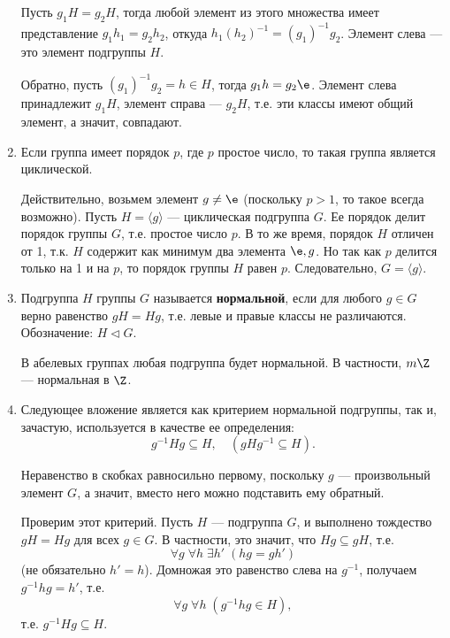 \begin{enumerate}
Пусть $g_1H=g_2H$, тогда любой элемент из этого множества имеет представление $g_1h_1=g_2h_2$, откуда $h_1(h_2)^{-1}=(g_1)^{-1}g_2$. Элемент слева --- это элемент подгруппы $H$.

Обратно, пусть $(g_1)^{-1}g_2=h\in H$, тогда $g_1h=g_2\e$. Элемент слева принадлежит $g_1H$, элемент справа --- $g_2H$, т.е. эти классы имеют общий элемент, а значит, совпадают.

\item Если группа имеет порядок $p$, где $p$ простое число, то такая группа является циклической.

Действительно, возьмем элемент $g\ne\e$ (поскольку $p>1$, то такое всегда возможно). Пусть $H=\langle g\rangle$ --- циклическая подгруппа $G$. Ее порядок делит порядок группы $G$, т.е. простое число $p$. В то же время, порядок $H$ отличен от 1, т.к. $H$ содержит как минимум два элемента $\e,g$. Но так как $p$ делится только на 1 и на $p$, то порядок группы $H$ равен $p$. Следовательно, $G=\langle g\rangle$.




\item Подгруппа $H$ группы $G$ называется \textbf{нормальной}, если для любого $g\in G$ верно равенство $gH=Hg$, т.е. левые и правые классы не различаются. Обозначение: $H\vartriangleleft G$.

В абелевых группах любая подгруппа будет нормальной. В частности, $m\Z$ --- нормальная в $\Z$.

\item Следующее вложение является как критерием нормальной подгруппы, так и, зачастую, используется в качестве ее определения:
\begin{equation}\label{normcriteria}
g^{-1}Hg\subseteq H,\quad (gHg^{-1}\subseteq H).
\end{equation}

Неравенство в скобках равносильно первому, поскольку $g$ --- произвольный элемент $G$, а значит, вместо него можно подставить ему обратный.

Проверим этот критерий. Пусть $H$ --- подгруппа $G$, и выполнено тождество $gH=Hg$ для всех $g\in G$. В частности, это значит, что $Hg\subseteq gH$, т.е.
$$
\forall g\;\forall h\;\exists h'\;(hg=gh')
$$
(не обязательно $h'=h$). Домножая это равенство слева на $g^{-1}$, получаем $g^{-1}hg=h'$, т.е.
$$
\forall g\;\forall h\;(g^{-1}hg\in H),
$$
т.е. $g^{-1}Hg\subseteq H$.


\end{enumerate}
